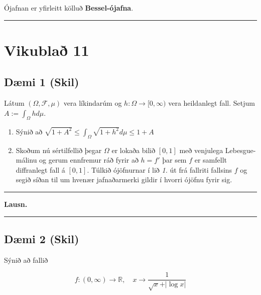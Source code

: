 \documentclass[]{book}
\begin{document}
Ójafnan er yfirleitt kölluð \textbf{Bessel-ójafna}.

\begin{center}\rule{0.5\linewidth}{\linethickness}\end{center}

\hypertarget{vikubla-11}{%
\chapter*{Vikublað 11}\label{vikubla-11}}

\hypertarget{dmi-1-skil-1}{%
\section*{Dæmi 1 (Skil)}\label{dmi-1-skil-1}}

Látum \((\Omega,\mathcal F, \mu)\) vera líkindarúm og \(h:\Omega\rightarrow[0,\infty)\) vera heildanlegt fall. Setjum \(A:=\int_\Omega hd\mu\).

\begin{enumerate}
\def\labelenumi{\arabic{enumi}.}
\item
  Sýnið að \(\sqrt{1 + A^2} \leq \int_\Omega\sqrt{1 + h^2}d\mu\leq 1 + A\)
\item
  Skoðum nú sértilfellið þegar \(\Omega\) er lokaða bilið \([0,1]\) með venjulega Lebesgue-málinu og gerum ennfremur ráð fyrir að \(h = f'\) þar sem \(f\) er samfellt diffranlegt fall á \([0,1]\). Túlkið ójöfnurnar í lið \emph{1.} út frá fallriti fallsins \(f\) og segið síðan til um hvenær jafnaðarmerki gildir í hvorri ójöfnu fyrir sig.
\end{enumerate}

\begin{center}\rule{0.5\linewidth}{\linethickness}\end{center}

\textbf{Lausn.}

\begin{center}\rule{0.5\linewidth}{\linethickness}\end{center}

\hypertarget{dmi-2-skil-1}{%
\section*{Dæmi 2 (Skil)}\label{dmi-2-skil-1}}

Sýnið að fallið

\[
f:(0,\infty)\rightarrow\mathbb R, \quad x\rightarrow\frac{1}{\sqrt x + \vert\log x\vert}
\]
\end{document}
